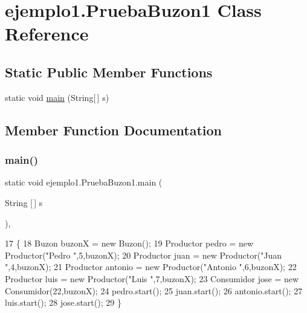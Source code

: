 \hypertarget{classejemplo1_1_1_prueba_buzon1}{}\section{ejemplo1.\+Prueba\+Buzon1 Class Reference}
\label{classejemplo1_1_1_prueba_buzon1}
\subsection*{Static Public Member Functions}
\begin{DoxyCompactItemize}
\item 
static void \mbox{\hyperlink{classejemplo1_1_1_prueba_buzon1_afec3b6ac421215cf389aefc11a299760}{main}} (String\mbox{[}$\,$\mbox{]} s)
\end{DoxyCompactItemize}


\subsection{Member Function Documentation}
\mbox{\label{classejemplo1_1_1_prueba_buzon1_afec3b6ac421215cf389aefc11a299760}} 
\subsubsection{\texorpdfstring{main()}{main()}}
{\footnotesize\ttfamily static void ejemplo1.\+Prueba\+Buzon1.\+main (\begin{DoxyParamCaption}\item[{String \mbox{[}$\,$\mbox{]}}]{s }\end{DoxyParamCaption})\hspace{0.3cm}{\ttfamily [inline]}, {\ttfamily [static]}}


\begin{DoxyCode}
17     \{
18         Buzon buzonX = \textcolor{keyword}{new} Buzon();
19         Productor pedro = \textcolor{keyword}{new} Productor(\textcolor{stringliteral}{"Pedro "},5,buzonX);
20         Productor juan = \textcolor{keyword}{new} Productor(\textcolor{stringliteral}{"Juan "},4,buzonX);
21         Productor antonio = \textcolor{keyword}{new} Productor(\textcolor{stringliteral}{"Antonio "},6,buzonX);
22         Productor luis = \textcolor{keyword}{new} Productor(\textcolor{stringliteral}{"Luis "},7,buzonX);
23         Consumidor jose = \textcolor{keyword}{new} Consumidor(22,buzonX);
24         pedro.start();
25         juan.start();
26         antonio.start();
27         luis.start();
28         jose.start();
29     \}
\end{DoxyCode}
